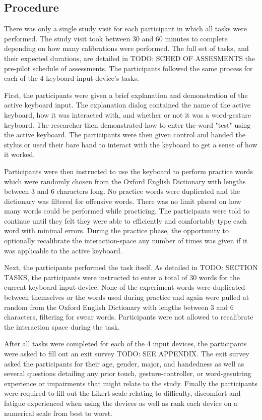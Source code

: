 \subsection{Procedure} \label{pre_procedure}

There was only a single study visit for each participant in which all tasks were performed. The study visit took between 30 and 60 minutes to complete depending on how many calibrations were performed. The full set of tasks, and their expected durations, are detailed in TODO: SCHED OF ASSESMENTS the pre-pilot schedule of assessments. The participants followed the same process for each of the 4 keyboard input device's tasks.

First, the participants were given a brief explanation and demonstration of the active keyboard input. The explanation dialog contained the name of the active keyboard, how it was interacted with, and whether or not it was a word-gesture keyboard. The researcher then demonstrated how to enter the word "test" using the active keyboard. The participants were then given control and handed the stylus or used their bare hand to interact with the keyboard to get a sense of how it worked.

Participants were then instructed to use the keyboard to perform practice words which were randomly chosen from the Oxford English Dictionary with lengths between 3 and 6 characters long. No practice words were duplicated and the dictionary was filtered for offensive words. There was no limit placed on how many words could be performed while practicing. The participants were told to continue until they felt they were able to efficiently and comfortably type each word with minimal errors. During the practice phase, the opportunity to optionally recalibrate the interaction-space any number of times was given if it was applicable to the active keyboard.

Next, the participants performed the task itself. As detailed in TODO: SECTION TASKS, the participants were instructed to enter a total of 30 words for the current keyboard input device. None of the experiment words were duplicated between themselves or the words used during practice and again were pulled at random from the Oxford English Dictionary with lengths between 3 and 6 characters, filtering for swear words. Participants were not allowed to recalibrate the interaction space during the task. 

After all tasks were completed for each of the 4 input devices, the participants were asked to fill out an exit survey TODO: SEE APPENDIX. The exit survey asked the participants for their age, gender, major, and handedness as well as several questions detailing any prior touch, gesture-controller, or word-gesutring experience or impairments that might relate to the study. Finally the participants were required to fill out the Likert scale relating to difficulty, discomfort and fatigue experienced when using the devices as well as rank each device on a numerical scale from best to worst.

